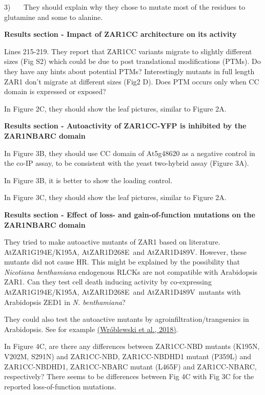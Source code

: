 \documentclass[10pt]{article}
\begin{document}
3)~~~ They should explain why they chose to mutate most of the residues
to glutamine and some to alanine.

\par\null

\textbf{Results section - Impact of ZAR1CC architecture on its activity}

Lines 215-219. They report that ZAR1CC variants migrate to slightly
different sizes (Fig S2) which could be due to post translational
modifications (PTMs). Do they have any hints about potential PTMs?
Interestingly mutants in full length ZAR1 don't migrate at different
sizes (Fig2 D). Does PTM occurs only when CC domain is expressed or
exposed?

In Figure 2C, they should show the leaf pictures, similar to Figure 2A.

\par\null

\textbf{Results section - Autoactivity of ZAR1CC-YFP is inhibited by the
ZAR1NBARC domain}

In Figure 3B, they should use CC domain of At5g48620 as a negative
control in the co-IP assay, to be consistent with the yeast two-hybrid
assay (Figure 3A).

In Figure 3B, it is better to show the loading control.

In Figure 3C, they should show the leaf pictures, similar to Figure 2A.

\par\null

\textbf{Results section - Effect of loss- and gain-of-function mutations
on the ZAR1NBARC domain}

They tried to make autoactive mutants of ZAR1 based on literature.
AtZAR1G194E/K195A, AtZAR1D268E~and AtZAR1D489V. However, these mutants
did not cause HR. This might be explained by the possibility that
\emph{Nicotiana benthamiana} endogenous RLCKs are not compatible with
Arabidopsis ZAR1. Can they test cell death inducing activity by
co-expressing AtZAR1G194E/K195A, AtZAR1D268E~and AtZAR1D489V~mutants
with Arabidopsis ZED1 in \emph{N. benthamiana}?

They could also test the autoactive mutants by
agroinfiltration/trangsenics in Arabidopsis. See for example
\hyperref[csl:3]{(Wróblewski et al., 2018)}.

In Figure 4C, are there any differences between ZAR1CC-NBD mutants
(K195N, V202M, S291N) and ZAR1CC-NBD, ZAR1CC-NBDHD1 mutant (P359L) and
ZAR1CC-NBDHD1, ZAR1CC-NBARC mutant (L465F) and ZAR1CC-NBARC,
respectively? There seems to be differences between Fig 4C with Fig 3C
for the reported loss-of-function mutations.
\end{document}
